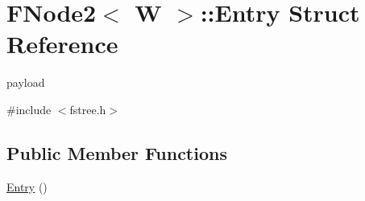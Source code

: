 \hypertarget{structFNode2_1_1Entry}{\section{F\-Node2$<$ W $>$\-:\-:Entry Struct Reference}
\label{structFNode2_1_1Entry}
}


payload  




{\ttfamily \#include $<$fstree.\-h$>$}

\subsection*{Public Member Functions}
\begin{DoxyCompactItemize}
\item 
\hyperlink{structFNode2_1_1Entry_a118034ad14627e2b5e83308390cc70ae}{Entry} ()
\end{DoxyCompactItemize}
